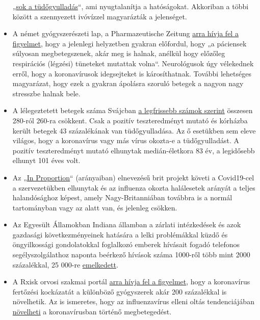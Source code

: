 \begin{itemize}
  „\href{https://www.aerzteblatt.de/nachrichten/97750/Vielzahl-an-Lungenentzuendungen-beunruhigen-Behoerden-in-Norditalien}{sok
  a tüdőgyulladás}``, ami nyugtalanítja a hatóságokat. Akkoriban a többi
  között a szennyezett ivóvízzel magyarázták a jelenséget.
\item
  A német gyógyszerészeti lap, a Pharmazeutische Zeitung
  \href{https://www.pharmazeutische-zeitung.de/atemstillstand-koennte-auch-zentrale-ursache-haben-116664/}{arra
  hívja fel a figyelmet}, hogy a jelenlegi helyzetben gyakran előfordul,
  hogy „a páciensek súlyosan megbetegszenek, akár meg is halnak, anélkül
  hogy előzőleg respirációs (légzési) tüneteket mutattak volna``.
  Neurológusok úgy vélekednek erről, hogy a koronavírusok idegsejteket
  is károsíthatnak. További lehetséges magyarázat, hogy ezek a gyakran
  ápolásra szoruló betegek a nagyon nagy stresszbe halnak bele.
\item
  A lélegeztetett betegek száma Svájcban
  \href{https://www.bag.admin.ch/dam/bag/de/dokumente/mt/k-und-i/aktuelle-ausbrueche-pandemien/2019-nCoV/covid-19-lagebericht.pdf.download.pdf/COVID-19_Epidemiologische_Lage_Schweiz.pdf}{a
  legfrissebb számok szerint} összesen 280-ról 260-ra csökkent. Csak a
  pozitív teszteredményt mutató és kórházba került betegek 43
  százalékának van tüdőgyulladása. Az ő esetükben sem eleve világos,
  hogy a koronavírus vagy más vírus okozta-e a tüdőgyulladást. A pozitív
  teszteredményt mutató elhunytak medián-életkora 83 év, a legidősebb
  elhunyt 101 éves volt.
\item
  Az „\href{http://inproportion2.talkigy.com/}{In Proportion}``
  (arányaiban) elnevezésű brit projekt követi a Covid19-cel a
  szervezetükben elhunytak és az influenza okozta halálesetek arányát a
  teljes halandósághoz képest, amely Nagy-Britanniában továbbra is a
  normál tartományban vagy az alatt van, és jelenleg csökken.
\item
  Az Egyesült Államokban Indiana államban a zárlati intézkedések és azok
  gazdasági következményeinek hatására a lelki problémákkal küzdő és
  öngyilkossági gondolatokkal foglalkozó emberek hívásait fogadó
  telefonos segélyszolgálathoz naponta beérkező hívások száma 1000-ről
  több mint 2000 százalékkal, 25 000-re
  \href{https://twitter.com/JesseKellyDC/status/1246449878219145216}{emelkedett}.
\item
  A Rxisk orvosi szakmai portál
  \href{https://rxisk.org/medications-compromising-covid-infections/}{arra
  hívja fel a figyelmet}, hogy a koronavírus fertőzési kockázatát a
  különböző gyógyszerek akár 200 százalékkal is növelhetik. Az is
  ismeretes, hogy az influenzavírus elleni oltás tendenciájában
  \href{https://www.sciencedirect.com/science/article/pii/S0264410X19313647?via=ihub}{növelheti}
  a koronavírusban történő megbetegedést.
\end{itemize}


